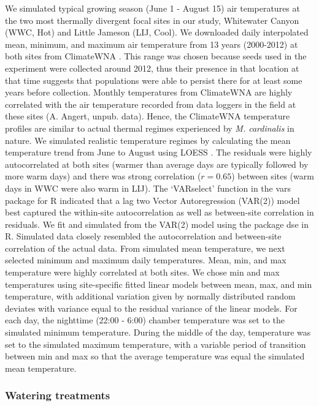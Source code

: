 \documentclass[11pt, oneside]{article}
\newcommand{\pkg}[1]{{\fontseries{b}\selectfont #1}}
\begin{document}
We simulated typical growing season (June 1 - August 15) air temperatures at the two most thermally divergent focal sites in our study, Whitewater Canyon (WWC, Hot) and Little Jameson (LIJ, Cool). We downloaded daily interpolated mean, minimum, and maximum air temperature from 13 years (2000-2012) at both sites from ClimateWNA \citep{Wang_etal_2012}. This range was chosen because seeds used in the experiment were collected around 2012, thus their presence in that location at that time suggests that populations were able to persist there for at least some years before collection. Monthly temperatures from ClimateWNA are highly correlated with the air temperature recorded from data loggers in the field at these sites (A. Angert, unpub. data). Hence, the ClimateWNA temperature profiles are similar to actual thermal regimes experienced by \textit{M. cardinalis} in nature. We simulated realistic temperature regimes by calculating the mean temperature trend from June to August using LOESS \citep{Cleveland_etal_1992}. The residuals were highly autocorrelated at both sites (warmer than average days are typically followed by more warm days) and there was strong correlation ($r = 0.65$) between sites (warm days in WWC were also warm in LIJ). The `VARselect' function in the \pkg{vars} package for R \citep{Pfaff_2008} indicated that a lag two Vector Autoregression (VAR(2)) model best captured the within-site autocorrelation as well as between-site correlation in residuals. We fit and simulated from the VAR(2) model using the package \pkg{dse} \citep{Gilbert_2014} in R. Simulated data closely resembled the autocorrelation and between-site correlation of the actual data. From simulated mean temperature, we next selected minimum and maximum daily temperatures. Mean, min, and max temperature were highly correlated at both sites. We chose min and max temperatures using site-specific fitted linear models between mean, max, and min temperature, with additional variation given by normally distributed random deviates with variance equal to the residual variance of the linear models. For each day, the nighttime (22:00 - 6:00) chamber temperature was set to the simulated minimum temperature. During the middle of the day, temperature was set to the simulated maximum temperature, with a variable period of transition between min and max so that the average temperature was equal the simulated mean temperature.

\subsubsection*{Watering treatments}
\end{document}
